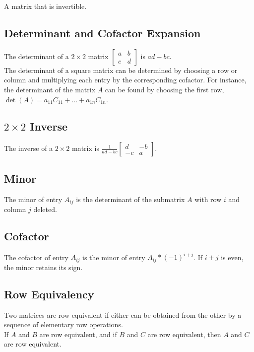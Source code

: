 \documentclass[12pt]{article}
\begin{document}
A matrix that is invertible.


\subsection{Determinant and Cofactor Expansion}

The determinant of a $2\times2$ matrix $\begin{bmatrix}a&b\\c&d\end{bmatrix}$ is $ad - bc$.\\
    The determinant of a square matrix can be determined by choosing a row or column and multiplying each entry by the corresponding cofactor. For instance, the determinant of the matrix $A$ can be found by choosing the first row, $\det(A) = a_{11}C_{11} + \dots + a_{1n}C_{1n}$.


\subsection{$2\times2$ Inverse}

The inverse of a $2\times2$ matrix is $\displaystyle\frac{1}{ad - bc} \begin{bmatrix}d&-b\\-c&a\end{bmatrix}$.


\subsection{Minor}

The minor of entry $A_{ij}$ is the determinant of the submatrix $A$ with row $i$ and column $j$ deleted.


\subsection{Cofactor}

The cofactor of entry $A_{ij}$ is the minor of entry $A_{ij} * (-1)^{i + j}$. If $i + j$ is even, the minor retains its sign.


\subsection{Row Equivalency}

Two matrices are row equivalent if either can be obtained from the other by a sequence of elementary row operations.\\
If $A$ and $B$ are row equivalent, and if $B$ and $C$ are row equivalent, then $A$ and $C$ are row equivalent.
\end{document}
